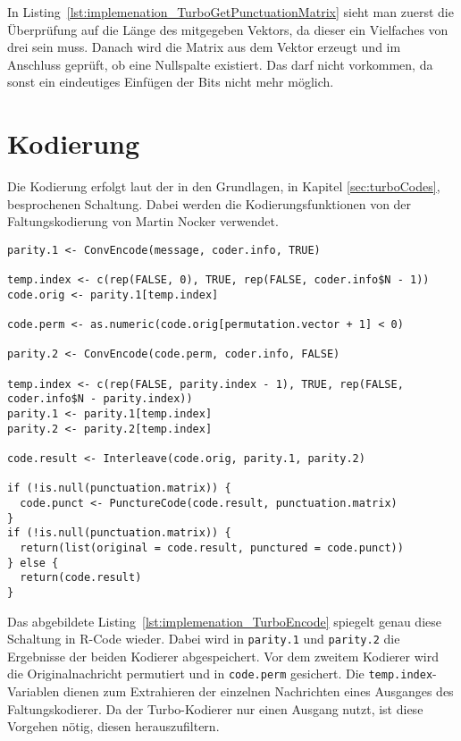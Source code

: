 In Listing~\ref{lst:implemenation_TurboGetPunctuationMatrix} sieht man zuerst die Überprüfung auf die Länge des mitgegeben Vektors, da dieser ein Vielfaches von drei sein muss. Danach wird die Matrix aus dem Vektor erzeugt und im Anschluss geprüft, ob eine Nullspalte existiert. Das darf nicht vorkommen, da sonst ein eindeutiges Einfügen der Bits nicht mehr möglich.

\FloatBarrier
\section{Kodierung}
\label{sec:implementation_encode}
Die Kodierung erfolgt laut der in den Grundlagen, in Kapitel \ref{sec:turboCodes}, besprochenen Schaltung. Dabei werden die Kodierungsfunktionen von der Faltungskodierung von Martin Nocker \cite{nocker} verwendet.

\begin{lstlisting}[caption=Implementierung von \texttt{TurboEncode}, label={lst:implemenation_TurboEncode}, float=!th]
parity.1 <- ConvEncode(message, coder.info, TRUE)

temp.index <- c(rep(FALSE, 0), TRUE, rep(FALSE, coder.info$N - 1))
code.orig <- parity.1[temp.index]

code.perm <- as.numeric(code.orig[permutation.vector + 1] < 0)

parity.2 <- ConvEncode(code.perm, coder.info, FALSE)

temp.index <- c(rep(FALSE, parity.index - 1), TRUE, rep(FALSE, coder.info$N - parity.index))
parity.1 <- parity.1[temp.index]
parity.2 <- parity.2[temp.index]

code.result <- Interleave(code.orig, parity.1, parity.2)

if (!is.null(punctuation.matrix)) {
  code.punct <- PunctureCode(code.result, punctuation.matrix)
}
if (!is.null(punctuation.matrix)) {
  return(list(original = code.result, punctured = code.punct))
} else {
  return(code.result)
}
\end{lstlisting}

Das abgebildete Listing~\ref{lst:implemenation_TurboEncode} spiegelt genau diese Schaltung in R-Code wieder. Dabei wird in \texttt{parity.1} und \texttt{parity.2} die Ergebnisse der beiden Kodierer abgespeichert. Vor dem zweitem Kodierer wird die Originalnachricht permutiert und in \texttt{code.perm} gesichert. Die \texttt{temp.index}-Variablen dienen zum Extrahieren der einzelnen Nachrichten eines Ausganges des Faltungskodierer. Da der Turbo-Kodierer nur einen Ausgang nutzt, ist diese Vorgehen nötig, diesen herauszufiltern.

